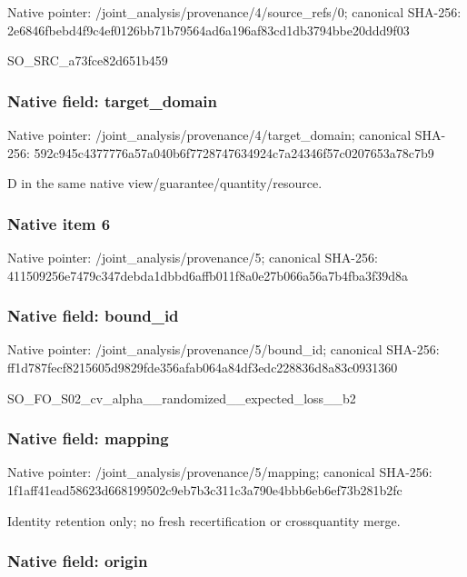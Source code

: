 \documentclass[10pt,a4paper]{article}
\begin{document}
Native pointer: /joint\_analysis/provenan\allowbreak{}ce/4/source\_refs/0; canonical SHA-256: 2e6846fbebd4f9c4ef0126bb\allowbreak{}71b79564ad6a196af83cd1db\allowbreak{}3794bbe20ddd9f03


SO\_SRC\_a73fce82d651b459


\subsubsection{Native field: target\_domain}


Native pointer: /joint\_analysis/provenan\allowbreak{}ce/4/target\_domain; canonical SHA-256: 592c945c4377776a57a040b6\allowbreak{}f7728747634924c7a24346f5\allowbreak{}7c0207653a78c7b9


D in the same native view/guarantee/quantity/resource.


\subsubsection{Native item 6}


Native pointer: /joint\_analysis/provenance/5; canonical SHA-256: 411509256e7479c347debda1\allowbreak{}dbbd6affb011f8a0e27b066a\allowbreak{}56a7b4fba3f39d8a



\subsubsection{Native field: bound\_id}


Native pointer: /joint\_analysis/provenance/5/bound\_id; canonical SHA-256: ff1d787fecf8215605d9829f\allowbreak{}de356afab064a84df3edc228\allowbreak{}836d8a83c0931360


SO\_FO\_S02\_cv\_alpha\_\_rand\allowbreak{}omized\_\_expected\_loss\_\_b\allowbreak{}2


\subsubsection{Native field: mapping}


Native pointer: /joint\_analysis/provenance/5/mapping; canonical SHA-256: 1f1aff41ead58623d6681995\allowbreak{}02c9eb7b3c311c3a790e4bbb\allowbreak{}6eb6ef73b281b2fc


Identity retention only; no fresh recertification or crossquantity merge.


\subsubsection{Native field: origin}
\end{document}
